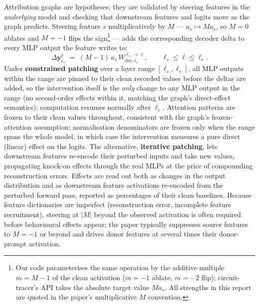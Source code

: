 \documentclass[11pt,a4paper]{article}
\newcommand{\deci}[2]{W_{\mathrm{dec},#2}^{#1}}   %
\begin{document}
Attribution graphs are hypotheses; they are validated by steering features in the
\emph{underlying} model and checking that downstream features and logits move as the
graph predicts. Steering feature $s$ multiplicatively by $M$ --- $a_s \mapsto M a_s$,
so $M{=}0$ ablates and $M{=}-1$ flips the sign\footnote{Our code parameterises the
same operation by the additive multiple $m = M-1$ of the clean activation
($m{=}{-}1$ ablate, $m{=}{-}2$ flip); circuit-tracer's API takes the absolute target
value $Ma_s$. All strengths in this report are quoted in the paper's multiplicative
$M$ convention.} --- adds the corresponding decoder delta to every MLP output the
feature writes to:
\begin{equation}
\Delta \bm{y}^{\ell}_{c_s} \;=\; (M-1)\,a_s\, \deci{\ell_s\to\ell}{i_s},
\qquad \ell_s \le \ell \le \ell_e .
\end{equation}
Under \textbf{constrained patching} over a layer range $[\ell_s,\ell_e]$, all MLP
outputs within the range are pinned to their clean recorded values before the deltas
are added, so the intervention itself is the \emph{only} change to any MLP output in
the range (no second-order effects within it, matching the graph's direct-effect
semantics); computation resumes normally after $\ell_e$. Attention patterns are frozen
to their clean values throughout, consistent with the graph's frozen-attention
assumption; normalisation denominators are frozen only when the range spans the whole
model, in which case the intervention measures a pure direct (linear) effect on the
logits. The alternative, \textbf{iterative patching}, lets downstream features
re-encode their perturbed inputs and take new values, propagating knock-on effects
through the real MLPs at the price of compounding reconstruction errors. Effects are
read out both as changes in the output distribution and as downstream feature
activations re-encoded from the perturbed forward pass, reported as percentages of
their clean baselines. Because feature dictionaries are imperfect (reconstruction
error, incomplete feature recruitment), steering at $\lvert M\rvert$ beyond the
observed activation is often required before behavioural effects appear; the paper
typically suppresses source features to $M=-1$ or beyond and drives donor features at
several times their donor-prompt activation.
\end{document}
